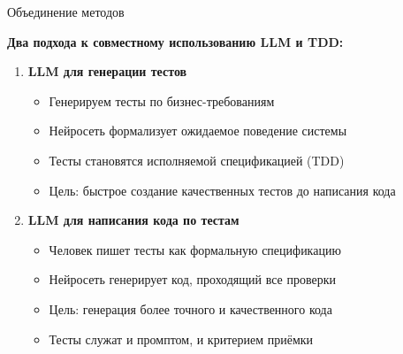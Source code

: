 \begin{frame}{Объединение методов}

\textbf{Два подхода к совместному использованию LLM и TDD:}

\vspace{0.5cm}

\begin{enumerate}
    \item \textbf{LLM для генерации тестов}
    \begin{itemize}
        \item Генерируем тесты по бизнес-требованиям
        \item Нейросеть формализует ожидаемое поведение системы
        \item Тесты становятся исполняемой спецификацией (TDD)
        \item Цель: быстрое создание качественных тестов до написания кода
    \end{itemize}

    \vspace{0.5cm}

    \item \textbf{LLM для написания кода по тестам}
    \begin{itemize}
        \item Человек пишет тесты как формальную спецификацию
        \item Нейросеть генерирует код, проходящий все проверки
        \item Цель: генерация более точного и качественного кода
        \item Тесты служат и промптом, и критерием приёмки
    \end{itemize}
\end{enumerate}

\end{frame}